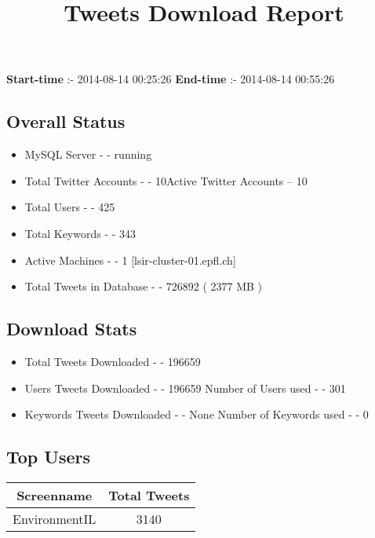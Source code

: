 \documentclass{article}\usepackage[T1]{fontenc}
\begin{document}
\title{\textbf{Tweets Download Report}}
               \date{}
                \maketitle
               \centerline{\textbf{Start-time} :- 2014-08-14 00:25:26 \hspace{40pt} \textbf{End-time} :- 2014-08-14 00:55:26}               \subsection*{Overall Status}                \begin{itemize}                \item MySQL Server - - running               \item Total Twitter Accounts - - 10\newline Active Twitter Accounts -- 10               \item Total Users - - 425               \item Total Keywords - - 343               \item Active Machines - - 1 [lsir-cluster-01.epfl.ch]               \item Total Tweets in Database - - 726892 ( 2377 MB )               \end{itemize}               \subsection*{Download Stats}                \begin{itemize}                \item Total Tweets Downloaded - - 196659               \item Users Tweets Downloaded - - 196659 \newline Number of Users used - - 301               \item Keywords Tweets Downloaded - - None \newline Number of Keywords used - - 0              \end{itemize}              \subsection*{Top Users}\begin{tabular}{|c|c|}         \hline         Screenname & Total Tweets \\ 
 \hline
EnvironmentIL & 3140\\ 

\end{tabular}
\end{document}
